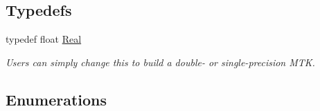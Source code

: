 \subsection*{Typedefs}
\begin{DoxyCompactItemize}
\item 
typedef float \hyperlink{group__c01-roots_gac080bbbf5cbb5502c9f00405f894857d}{Real}
\begin{DoxyCompactList}\small\item\em Users can simply change this to build a double-\/ or single-\/precision M\-T\-K. \end{DoxyCompactList}\end{DoxyCompactItemize}
\subsection*{Enumerations}

